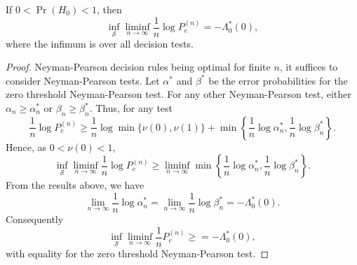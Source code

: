 \begin{theorem}[Chernoff]
If $0 < \Pr (H_0) < 1$, then
\begin{equation*}
\inf_{\mathcal{S}} \liminf_{n \rightarrow \infty} \frac{1}{n} \log P_e^{(n)}
= - \Lambda_0^* (0) ,
\end{equation*}
where the infimum is over all decision tests.
\end{theorem}
\begin{proof}
Neyman-Pearson decision rules being optimal for finite $n$, it suffices to consider Neyman-Pearson tests.
Let $\alpha^*$ and $\beta^*$ be the error probabilities for the zero threshold Neyman-Pearson test.
For any other Neyman-Pearson test, either $\alpha_n \geq \alpha_n^*$ or $\beta_n \geq \beta_n^*$.
Thus, for any test
\begin{equation*}
\frac{1}{n} \log P_e^{(n)} \geq \frac{1}{n} \log \min \{ \nu (0), \nu(1) \}
+ \min \left\{ \frac{1}{n} \log \alpha_n^*, \frac{1}{n} \log \beta_n^* \right\} .
\end{equation*}
Hence, as $0 < \nu(0) < 1$,
\begin{equation*}
\inf_{\mathcal{S}} \liminf_{n \rightarrow \infty}
\frac{1}{n} \log P_e^{(n)} \geq \liminf_{n \rightarrow \infty}
\min \left\{ \frac{1}{n} \log \alpha_n^*, \frac{1}{n} \log \beta_n^* \right\} .
\end{equation*}
From the results above, we have
\begin{equation*}
\lim_{n \rightarrow \infty} \frac{1}{n} \log \alpha_n^*
= \lim_{n \rightarrow \infty} \frac{1}{n} \log \beta_n^*
= - \Lambda_0^* (0) .
\end{equation*}
Consequently
\begin{equation*}
\inf_{\mathcal{S}} \liminf_{n \rightarrow \infty}
\frac{1}{n} P_e^{(n)} \geq = - \Lambda_0^* (0) ,
\end{equation*}
with equality for the zero threshold Neyman-Pearson test.
\end{proof}

